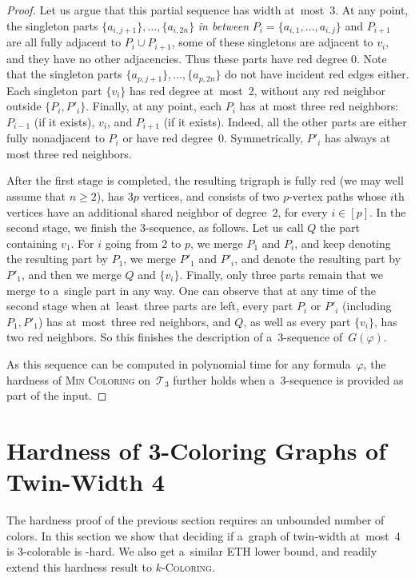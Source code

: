 \documentclass[a4paper,USenglish,cleveref,hyperref,autoref]{lipics-v2021}
\newcommand{\chr}{\textsc{Min Coloring}\xspace}
\begin{document}
\begin{proof}
  Let us argue that this partial sequence has width at~most~3.
  At any point, the singleton parts $\{a_{i,j+1}\}, \ldots, \{a_{i,2n}\}$ \emph{in between} $P_i = \{a_{i,1}, \ldots, a_{i,j}\}$ and $P_{i+1}$ are all fully adjacent to $P_i \cup P_{i+1}$, some of these singletons are adjacent to $v_i$, and they have no other adjacencies.
  Thus these parts have red degree 0.
  Note that the singleton parts $\{a_{p,j+1}\}, \ldots, \{a_{p,2n}\}$ do not have incident red edges either.
  Each singleton part $\{v_i\}$ has red degree at~most~2, without any red neighbor outside $\{P_i, P'_i\}$.
  Finally, at any point, each $P_i$ has at most three red neighbors: $P_{i-1}$ (if it exists), $v_i$, and $P_{i+1}$ (if it exists).
  Indeed, all the other parts are either fully nonadjacent to $P_i$ or have red degree~0.
  Symmetrically, $P'_i$ has always at most three red neighbors.

  After the first stage is completed, the resulting trigraph is fully red (we may well assume that $n \geqslant 2$), has $3p$ vertices, and consists of two $p$-vertex paths whose $i$th vertices have an additional shared neighbor of degree~2, for every $i \in [p]$.  
  In the second stage, we finish the 3-sequence, as follows.
  Let us call $Q$ the part containing $v_1$. 
  For $i$ going from 2 to $p$, we merge $P_1$ and $P_i$, and keep denoting the resulting part by $P_1$, we merge $P'_1$ and $P'_i$, and denote the resulting part by $P'_1$, and then we merge $Q$ and $\{v_i\}$.
  Finally, only three parts remain that we merge to a~single part in any way.
  One can observe that at any time of the second stage when at~least~three parts are left, every part $P_i$ or $P'_i$ (including $P_1, P'_1$) has at~most~three red neighbors, and $Q$, as well as every part $\{v_i\}$, has two red neighbors. 
  So this finishes the description of a~3-sequence of~$G(\varphi)$.

  As this sequence can be computed in polynomial time for any formula~$\varphi$, the hardness of \chr on~$\mathcal T_3$ further holds when a~3-sequence is provided as part of the input.
\end{proof}

\section{Hardness of 3-Coloring Graphs of Twin-Width 4}\label{sec:tcol-hardness}

The hardness proof of the previous section requires an unbounded number of colors.
In this section we show that deciding if a~graph of twin-width at~most~4 is 3-colorable is \NP-hard.
We also get a~similar ETH lower bound, and readily extend this hardness result to \textsc{$k$-Coloring}.
\end{document}

